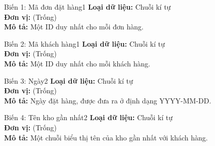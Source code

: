 \noindent
\begin{minipage}[t]{0.48\textwidth}
\begin{mainbox}{Biến 1: Mã đơn đặt hàng}{1}
    \textbf{Loại dữ liệu:} Chuỗi kí tự \\
    \textbf{Đơn vị:} (Trống) \\
    \textbf{Mô tả:} Một ID duy nhất cho mỗi đơn hàng.
\end{mainbox}
\end{minipage}
\hfill
\begin{minipage}[t]{0.48\textwidth}
\begin{mainbox}{Biến 2: Mã khách hàng}{1}
    \textbf{Loại dữ liệu:} Chuỗi kí tự \\
    \textbf{Đơn vị:} (Trống) \\
    \textbf{Mô tả:} Một ID duy nhất cho mỗi khách hàng.
\end{mainbox}
\end{minipage}

\vspace{0.5cm}

\noindent
\begin{minipage}[t]{0.48\textwidth}
\begin{mainbox}{Biến 3: Ngày}{2}
    \textbf{Loại dữ liệu:} Chuỗi kí tự \\
    \textbf{Đơn vị:} (Trống) \\
    \textbf{Mô tả:} Ngày đặt hàng, được đưa ra ở định dạng YYYY-MM-DD.
\end{mainbox}
\end{minipage}
\hfill
\begin{minipage}[t]{0.48\textwidth}
\begin{mainbox}{Biến 4: Tên kho gần nhất}{2}
    \textbf{Loại dữ liệu:} Chuỗi kí tự \\
    \textbf{Đơn vị:} (Trống) \\
    \textbf{Mô tả:} Một chuỗi biểu thị tên của kho gần nhất với khách hàng.
\end{mainbox}
\end{minipage}

\vspace{0.5cm}

